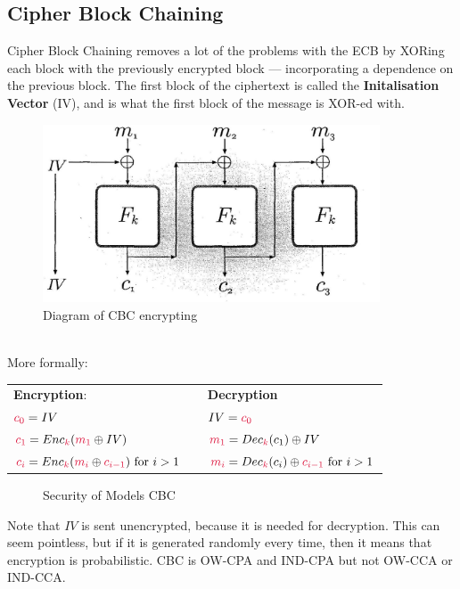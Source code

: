     \subsection{Cipher Block Chaining}
    Cipher Block Chaining removes a lot of the problems with the ECB by XORing each block with the previously encrypted block --- incorporating a dependence on the previous block. The first block of the ciphertext is called the \textbf{Initalisation Vector} (IV), and is what the first block of the message is XOR-ed with.\\
    \begin{figure}[htp!]
        \centering
        \includegraphics[width=10cm]{img/cbc}
        \caption{Diagram of CBC encrypting}
    \end{figure}
    \\
    More formally:\nopagebreak
    \begin{center}
    \begin{tabular}{lll}
    \textbf{Encryption}:                                        && \textbf{Decryption}\\
    $\csubc{0} = IV$                                                  && $IV = \csubc{0}$\\
    $\csubc{1} = Enc_\ck(\csubm{1} \oplus IV)$                                && $\csubm{1} = Dec_\ck(c_1) \oplus IV$\\
    $\csubc{i} = Enc_\ck(\csubm{i} \oplus \csubc{i-1}) \textrm{ for } i > 1$      && $\csubm{i} = Dec_\ck(c_i) \oplus \csubc{i-1} \textrm{ for } i > 1$\\
    \end{tabular}
    \end{center}
    \begin{figure}[htp!]
        \centering
        \caption{Security of Models CBC}
        \label{fig:cbc-attacktable}
    \end{figure}
    Note that $IV$ is sent unencrypted, because it is needed for decryption. This can seem pointless, but if it is generated randomly every time, then it means that encryption is probabilistic. CBC is OW-CPA and IND-CPA but not OW-CCA or IND-CCA.\\
